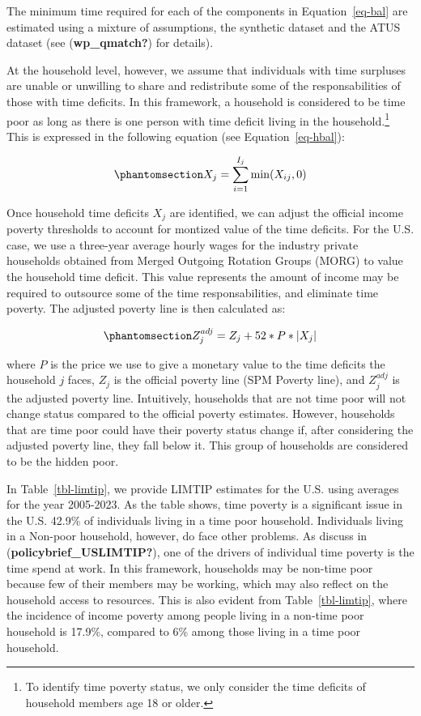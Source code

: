 \documentclass[
  11pt,
]{article}
\begin{document}
The minimum time required for each of the components in
Equation~\ref{eq-bal} are estimated using a mixture of assumptions, the
synthetic dataset and the ATUS dataset (see (\textbf{wp\_qmatch?}) for
details).

At the household level, however, we assume that individuals with time
surpluses are unable or unwilling to share and redistribute some of the
responsabilities of those with time deficits. In this framework, a
household is considered to be time poor as long as there is one person
with time deficit living in the household.\footnote{To identify time
  poverty status, we only consider the time deficits of household
  members age 18 or older.} This is expressed in the following equation
(see Equation~\ref{eq-hbal}):

\begin{equation}\phantomsection\label{eq-hbal}{X_{j} = \sum_{i=1}^{I_j} \min(X_{ij},0)
}\end{equation}

Once household time deficits \(X_{j}\) are identified, we can adjust the
official income poverty thresholds to account for montized value of the
time deficits. For the U.S. case, we use a three-year average hourly
wages for the industry private households obtained from Merged Outgoing
Rotation Groups (MORG) to value the household time deficit. This value
represents the amount of income may be required to outsource some of the
time responsabilities, and eliminate time poverty. The adjusted poverty
line is then calculated as:

\begin{equation}\phantomsection\label{eq-limtip}{Z_{j}^{adj} = Z_{j} + 52*P* |X_{j}|
}\end{equation}

where \(P\) is the price we use to give a monetary value to the time
deficits the household \({j}\) faces, \(Z_{j}\) is the official poverty
line (SPM Poverty line), and \(Z_{j}^{adj}\) is the adjusted poverty
line. Intuitively, households that are not time poor will not change
status compared to the official poverty estimates. However, households
that are time poor could have their poverty status change if, after
considering the adjusted poverty line, they fall below it. This group of
households are considered to be the hidden poor.

In Table~\ref{tbl-limtip}, we provide LIMTIP estimates for the U.S.
using averages for the year 2005-2023. As the table shows, time poverty
is a significant issue in the U.S. 42.9\% of individuals living in a
time poor household. Individuals living in a Non-poor household,
however, do face other problems. As discuss in
(\textbf{policybrief\_USLIMTIP?}), one of the drivers of individual time
poverty is the time spend at work. In this framework, households may be
non-time poor because few of their members may be working, which may
also reflect on the household access to resources. This is also evident
from Table~\ref{tbl-limtip}, where the incidence of income poverty among
people living in a non-time poor household is 17.9\%, compared to 6\%
among those living in a time poor household.
\end{document}
